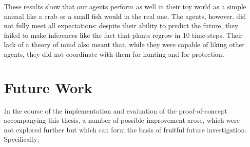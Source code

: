 These results show that our agents perform as well in their toy world as a simple animal like a crab or a small fish would in the real one. The agents, however, did not fully meet all expectations: despite their ability to predict the future, they failed to make inferences like the fact that plants regrow in 10 time-steps. Their lack of a theory of mind also meant that, while they were capable of liking other agents, they did not coordinate with them for hunting and for protection.

\section{Future Work}\label{sec:futureWork}

In the course of the implementation and evaluation of the proof-of-concept accompanying this thesis, a number of possible improvement arose, which were not explored further but which can form the basis of fruitful future investigation. Specifically:


